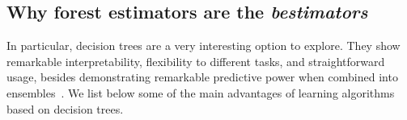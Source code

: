 \begin{itemize}
\subsection{Why forest estimators are the \textit{bestimators}}

In particular, decision trees are a very interesting option to explore. They show remarkable interpretability, flexibility to different tasks, and straightforward usage, besides demonstrating remarkable predictive power when combined into ensembles~\cite{breiman2001random, whyarebestfortabular}.  %
We list below some of the main advantages of learning algorithms based on decision trees.


\end{itemize}
